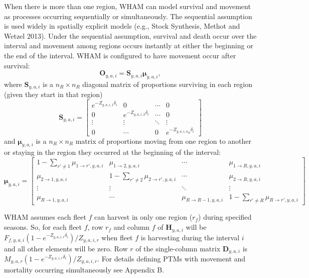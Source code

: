 \documentclass[
]{article}
\begin{document}
When there is more than one region, WHAM can model survival and movement as processes occurring sequentially or simultaneously. The sequential assumption is used widely in spatially explicit models (e.g., Stock Synthesis, Methot and Wetzel 2013). Under the sequential assumption, survival and death occur over the interval and movement among regions occurs instantly at either the beginning or the end of the interval. WHAM is configured to have movement occur after survival:
\begin{equation*}
  \mathbf{O}_{y,a,i} = \mathbf{S}_{y,a,i}\boldsymbol{\mu}_{y,a,i},
\end{equation*}
where \(\mathbf{S}_{y,a,i}\) is a \(n_R \times n_R\) diagonal matrix of proportions surviving in each region (given they start in that region)
\begin{equation*}
\mathbf{S}_{y,a,i} = 
  \begin{bmatrix}
    e^{-Z_{y,a,i,1}\delta_i} & 0 & \cdots & 0 \\
    0 & e^{-Z_{y,a,i,2}\delta_i} & \cdots & 0 \\
    \vdots & \vdots & \ddots & \vdots \\
    0 & \cdots & 0 & e^{-Z_{y,a,i,n_R}\delta_i}
  \end{bmatrix}
\end{equation*}
and \(\boldsymbol{\mu}_{y,a,i}\) is a \(n_R \times n_R\) matrix of proportions moving from one region to another or staying in the region they occurred at the beginning of the interval:
\begin{equation*}
\boldsymbol{\mu}_{y,a,i} = 
  \begin{bmatrix}
    1-\sum_{r' \neq 1} \mu_{1\rightarrow r',y,a,i} & \mu_{1\rightarrow 2,y,a,i} & \cdots & \mu_{1\rightarrow R,y,a,i} \\
    \mu_{2\rightarrow 1,y,a,i} & 1-\sum_{r' \neq 2} \mu_{2\rightarrow r',y,a,i} & \cdots & \mu_{2\rightarrow R,y,a,i} \\
    \vdots & \vdots & \ddots & \vdots \\
    \mu_{R\rightarrow 1,y,a,i} & \cdots & \mu_{R\rightarrow R-1,y,a,i} & 1-\sum_{r' \neq R} \mu_{R\rightarrow r',y,a,i}
  \end{bmatrix}
\end{equation*}

WHAM assumes each fleet \(f\) can harvest in only one region (\(r_f\)) during specified seasons. So, for each fleet \(f\), row \(r_f\) and column \(f\) of \(\mathbf{H}_{y,a,i}\) will be \(F_{f,y,a,i}\left(1 - e^{-Z_{y,a,i,r}\delta_i}\right)/Z_{y,a,i,r}\) when fleet \(f\) is harvesting during the interval \(i\) and all other elements will be zero. Row \(r\) of the single-column matrix \(\mathbf{D}_{y,a,i}\) is \(M_{y,a,r}\left(1 - e^{-Z_{y,a,i,r}\delta_i}\right)/Z_{y,a,i,r}\). For details defining PTMs with movement and mortality occurring simultaneously see Appendix B.
\end{document}
